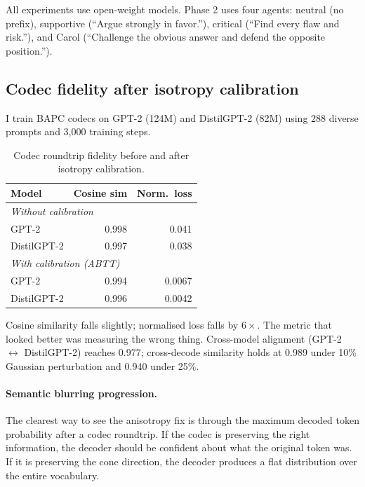 \documentclass[10pt,twocolumn]{article}
\begin{document}
All experiments use open-weight models. Phase 2 uses four agents: neutral (no prefix), supportive (``Argue strongly in favor.''), critical (``Find every flaw and risk.''), and Carol (``Challenge the obvious answer and defend the opposite position.'').

\subsection{Codec fidelity after isotropy calibration}

I train BAPC codecs on GPT-2 (124M) and DistilGPT-2 (82M) using 288 diverse prompts and 3,000 training steps.

\begin{table}[h]
\centering
\caption{Codec roundtrip fidelity before and after isotropy calibration.}
\label{tab:codec}
\small
\begin{tabular}{lrr}
\toprule
Model & Cosine sim & Norm.\ loss \\
\midrule
\multicolumn{3}{l}{\textit{Without calibration}} \\
GPT-2 & 0.998 & 0.041 \\
DistilGPT-2 & 0.997 & 0.038 \\
\midrule
\multicolumn{3}{l}{\textit{With calibration (ABTT)}} \\
GPT-2 & 0.994 & 0.0067 \\
DistilGPT-2 & 0.996 & 0.0042 \\
\bottomrule
\end{tabular}
\end{table}

Cosine similarity falls slightly; normalised loss falls by $6\times$. The metric that looked better was measuring the wrong thing. Cross-model alignment (GPT-2 $\leftrightarrow$ DistilGPT-2) reaches 0.977; cross-decode similarity holds at 0.989 under 10\% Gaussian perturbation and 0.940 under 25\%.

\paragraph{Semantic blurring progression.}
The clearest way to see the anisotropy fix is through the maximum decoded token probability after a codec roundtrip. If the codec is preserving the right information, the decoder should be confident about what the original token was. If it is preserving the cone direction, the decoder produces a flat distribution over the entire vocabulary.
\end{document}
